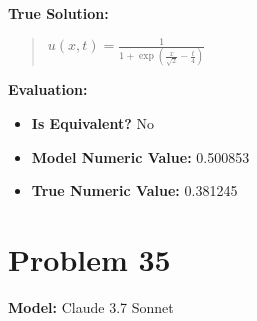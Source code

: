 \documentclass{article}
\begin{document}
\textbf{True Solution:}
\begin{quote}
$u(x,t) = \frac{1}{1+\exp{\left(\frac{x}{\sqrt{2}}-\frac{t}{4}\right)}}$
\end{quote}

\textbf{Evaluation:}
\begin{itemize}
\item \textbf{Is Equivalent?} No
\item \textbf{Model Numeric Value:} 0.500853
\item \textbf{True Numeric Value:} 0.381245
\end{itemize}
\vspace{1cm}
\section*{Problem 35}
\textbf{Model:} Claude 3.7 Sonnet
\end{document}
